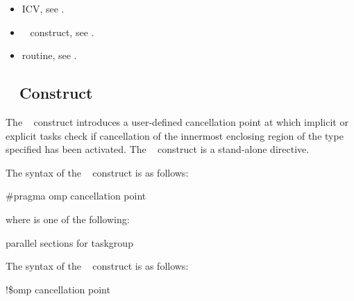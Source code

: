 \crossreferences
\begin{itemize}
\item {} ICV, see
.

\item {}~ construct, see 
.

\item {} routine, see 
.
\end{itemize}









\subsection{~ Construct}
\label{subsec:cancellation point Construct}
\summary
The ~ construct introduces a user-defined cancellation point at 
which implicit or explicit tasks check if cancellation of the innermost enclosing region 
of the type specified has been activated. The ~ construct is a 
stand-alone directive.

\syntax
\ccppspecificstart
The syntax of the ~ construct is as follows:

\begin{boxedcode}
\#pragma omp cancellation point 
\end{boxedcode}

where  is one of the following:

\begin{indentedcodelist}
parallel
sections
for
taskgroup
\end{indentedcodelist}
\ccppspecificend

\fortranspecificstart
The syntax of the ~ construct is as follows:

\begin{boxedcode}
!\$omp cancellation point 
\end{boxedcode}

